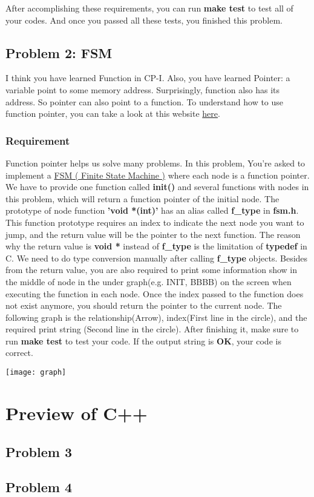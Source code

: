 \documentclass{report}
\begin{document}
After accomplishing these requirements, you can run \textbf{make test} to test all of
your codes.
And once you passed all these tests, you finished this problem.

\section{Problem 2: FSM}

I think you have learned Function in CP-I. Also, you have learned Pointer: a variable point to some memory address.
Surprisingly, function also has its address. So pointer can also point to a
function.
To understand how to use function pointer, you can take a look at this website
\href{https://chenhh.gitbooks.io/parallel_processing/content/cython/function_pointer.html}{here}.

\subsection{Requirement}

Function pointer helps us solve many problems. In this problem, You're asked to implement a
\href{https://zh.wikipedia.org/zh-tw/%E6%9C%89%E9%99%90%E7%8A%B6%E6%80%81%E6%9C%BA}{FSM
  ( Finite State Machine )} where each node is a function pointer.
We have to provide one function called \textbf{init()} and several functions with
nodes in this problem, which will return a function pointer of the initial node. The prototype of node function
\textbf{'void *(int)'} has an alias called \textbf{f\_type} in
\textbf{fsm.h}. This function prototype requires an index to indicate the next
node you want to jump, and the return
value will be the pointer to the next function. The reason why the return value is \textbf{void *}
instead of \textbf{f\_type} is the limitation of \textbf{typedef} in C.
We need to do type conversion manually after calling \textbf{f\_type} objects.
Besides from the return value, you are also required to print some information show
in the middle of node in the under graph(e.g. INIT, BBBB) on the
screen when executing the function in each node. Once the index passed to the
function does not exist anymore, you should return the pointer to the current node.
The following graph is the relationship(Arrow), index(First line in the circle),
and the required print string (Second line in the circle). After
finishing it, make sure to run \textbf{make test} to test your code. If the output string is \textbf{OK}, your code is correct.


\texttt{[image: graph]}









\chapter{Preview of C++}

\section{Problem 3}

\section{Problem 4}
\end{document}
